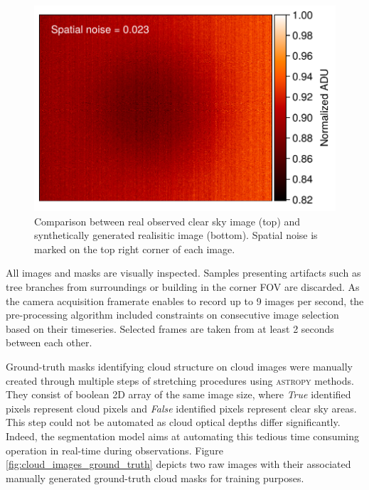 \documentclass[amt, article]{copernicus}
\begin{document}
\begin{figure}[t]
	\includegraphics[width=\hsize]{figures/synthetic_clear_sky_image.pdf}
	\caption{Comparison between real observed clear sky image (top) and synthetically generated realisitic image (bottom). Spatial noise is marked on the top right corner of each image.}
    \label{fig:synthetic_clear_sky_image}
\end{figure}

All images and masks are visually inspected. Samples presenting artifacts such as tree branches from surroundings or building in the corner FOV are discarded. As the camera acquisition framerate enables to record up to 9 images per second, the pre-processing algorithm included constraints on consecutive image selection based on their timeseries. Selected frames are taken from at least 2 seconds between each other.

Ground-truth masks identifying cloud structure on cloud images were manually created through multiple steps of stretching procedures using \textsc{astropy} methods. They consist of boolean 2D array of the same image size, where \textit{True} identified pixels represent cloud pixels and \textit{False} identified pixels represent clear sky areas. This step could not be automated as cloud optical depths differ significantly. Indeed, the segmentation model aims at automating this tedious time consuming operation in real-time during observations. Figure \ref{fig:cloud_images_ground_truth} depicts two raw images with their associated manually generated ground-truth cloud masks for training purposes.
\end{document}
